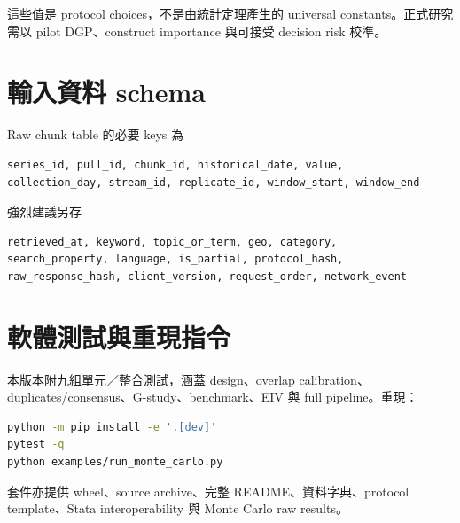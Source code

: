 \documentclass[12pt,a4paper,oneside]{article}
\begin{document}
這些值是 protocol choices，不是由統計定理產生的 universal constants。正式研究需以 pilot DGP、construct importance 與可接受 decision risk 校準。

\section{輸入資料 schema}

Raw chunk table 的必要 keys 為
\begin{lstlisting}
series_id, pull_id, chunk_id, historical_date, value,
collection_day, stream_id, replicate_id, window_start, window_end
\end{lstlisting}
強烈建議另存
\begin{lstlisting}
retrieved_at, keyword, topic_or_term, geo, category,
search_property, language, is_partial, protocol_hash,
raw_response_hash, client_version, request_order, network_event
\end{lstlisting}

\section{軟體測試與重現指令}

本版本附九組單元／整合測試，涵蓋 design、overlap calibration、duplicates/consensus、G-study、benchmark、EIV 與 full pipeline。重現：
\begin{lstlisting}[language=bash]
python -m pip install -e '.[dev]'
pytest -q
python examples/run_monte_carlo.py
\end{lstlisting}
套件亦提供 wheel、source archive、完整 README、資料字典、protocol template、Stata interoperability 與 Monte Carlo raw results。
\end{document}
